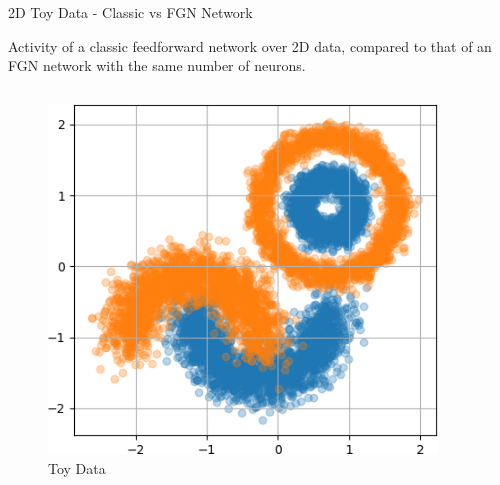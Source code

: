 \documentclass{beamer}
\begin{document}
\begin{frame}{2D Toy Data - Classic vs FGN Network}
    
    \vspace{-1cm}
    \begin{block}{}
    Activity of a classic feedforward network over 2D data, compared to that of an FGN network with the same number of neurons.
    \end{block}

    \begin{columns}
    \begin{column}{.333\textwidth}
    \vspace{2mm}
    \begin{figure}
        \centering
        \includegraphics[width=0.92\textwidth]{images/2D-network-toy/2d-toy-data.png}
        \caption*{Toy Data}
    \end{figure}


\end{column}
\end{columns}
\end{frame}
\end{document}
